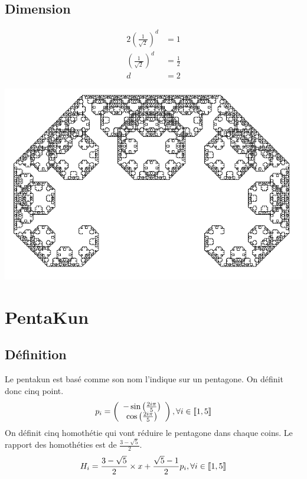 \documentclass[a4paper, 12pt]{report}
\begin{document}
			\subsection{Dimension}
				\begin{align*}
					 2\left(\frac{1}{\sqrt{2}}\right)^d	&=1\\
					 \left(\frac{1}{\sqrt{2}}\right)^d	&=\frac{1}{2}\\
													d	&=2
				\end{align*}
				\begin{center}
					\includegraphics[scale=0.7]{Images/levy}
				\end{center}
		\newpage
		\section{PentaKun}
			\subsection{Définition}
			Le pentakun est basé comme son nom l'indique sur un pentagone. On définit donc cinq point.
			\begin{equation*}
				p_i=\left(\begin{array}{ccc}
							-\sin\left(\frac{2i\pi}{5}\right)\\
							\cos\left(\frac{2i\pi}{5}\right)\\
						\end{array}\right)
						,\forall i\in\textrm{\textlbrackdbl} 1,5\textrm{\textrbrackdbl}
			\end{equation*}
			On définit cinq homothétie qui vont réduire le pentagone dans chaque coins. Le rapport des homothéties est de $\frac{3-\sqrt{5}}{2}$.
			\begin{equation*}
				H_i=\frac{3-\sqrt{5}}{2}\times x+\frac{\sqrt{5}-1}{2}p_i,\forall i\in\textrm{\textlbrackdbl} 1,5\textrm{\textrbrackdbl}
			\end{equation*}
\end{document}
